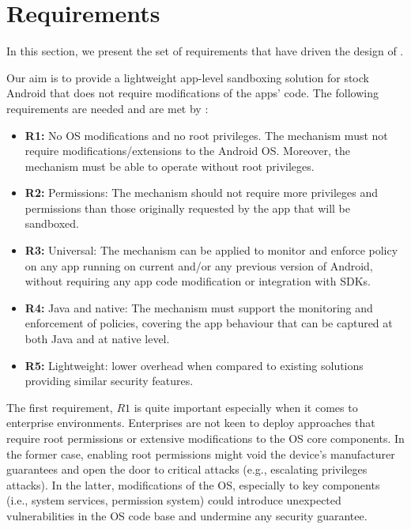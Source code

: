 \section{Requirements}
In this section, we present the set of requirements that have driven the design of \asd. 

Our aim is to provide a lightweight app-level sandboxing solution for stock Android that does not require modifications of the apps' code. The following requirements are needed and are met by \asd:
\begin{itemize}
\item \textbf{R1:} No OS modifications and no root privileges. The mechanism must not require  modifications/extensions to the Android OS. Moreover, the mechanism must be able to operate without root privileges. 

\item \textbf{R2:} Permissions: The mechanism should not require more privileges and permissions than those originally requested by the app that will be sandboxed. 

\item \textbf{R3:} Universal: The mechanism can be applied to monitor and enforce policy on any app running on current and/or any previous version of Android, without requiring any app code modification or integration with SDKs.

\item \textbf{R4:} Java and native: The mechanism must support the monitoring and enforcement of policies, covering the app behaviour that can be captured at both Java and at native level.

\item \textbf{R5:} Lightweight: lower overhead when compared to existing solutions providing similar security features.
\end{itemize}

The first requirement, $R1$ is quite important especially when it comes to enterprise environments. Enterprises are not keen to deploy approaches that require root permissions or extensive modifications to the OS core components. In the former case, enabling root permissions might void the device's manufacturer guarantees and open the door to  critical attacks (e.g., escalating privileges attacks).
In the latter, modifications of the OS, especially to key components (i.e., system services, permission system) could introduce unexpected vulnerabilities in the OS code base and undermine any security guarantee. 

